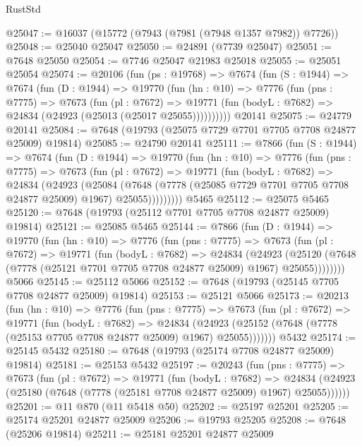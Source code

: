 \begin{lexlean}{RustStd}
\begin{coremodule}
{\begin{coremodule}
{{{{{{{{{{{{{{{{{{{{{{{{{{{{{{{{{{{{{{{{{{{{{{{{{{{{{@25047 := @16037 (@15772 (@7943 (@7981 (@7948 @1357 @7982)) @7726))
@25048 := @25040 @25047
@25050 := @24891 (@7739 @25047)
@25051 := @7648 @25050
@25054 := @7746 @25047 @21983 @25018
@25055 := @25051 @25054
@25074 := @20106
    (fun (ps : @19768) =>
    @7674
      (fun (S : @1944) =>
      @7674
        (fun (D : @1944) =>
        @19770
          (fun (hn : @10) =>
          @7776
            (fun (pns : @7775) =>
            @7673
              (fun (pl : @7672) =>
              @19771 (fun (bodyL : @7682) => @24834 (@24923 (@25013 (@25017 @25055))))))))))
    @20141
@25075 := @24779 @20141
@25084 := @7648 (@19793 (@25075 @7729 @7701 @7705 @7708 @24877 @25009) @19814)
@25085 := @24790 @20141
@25111 := @7866
    (fun (S : @1944) =>
    @7674
      (fun (D : @1944) =>
      @19770
        (fun (hn : @10) =>
        @7776
          (fun (pns : @7775) =>
          @7673
            (fun (pl : @7672) =>
            @19771
              (fun (bodyL : @7682) =>
              @24834
                (@24923
                  (@25084
                    (@7648
                      (@7778 (@25085 @7729 @7701 @7705 @7708 @24877 @25009) @1967)
                      @25055)))))))))
    @5465
@25112 := @25075 @5465
@25120 := @7648 (@19793 (@25112 @7701 @7705 @7708 @24877 @25009) @19814)
@25121 := @25085 @5465
@25144 := @7866
    (fun (D : @1944) =>
    @19770
      (fun (hn : @10) =>
      @7776
        (fun (pns : @7775) =>
        @7673
          (fun (pl : @7672) =>
          @19771
            (fun (bodyL : @7682) =>
            @24834
              (@24923
                (@25120 (@7648 (@7778 (@25121 @7701 @7705 @7708 @24877 @25009) @1967) @25055))))))))
    @5066
@25145 := @25112 @5066
@25152 := @7648 (@19793 (@25145 @7705 @7708 @24877 @25009) @19814)
@25153 := @25121 @5066
@25173 := @20213
    (fun (hn : @10) =>
    @7776
      (fun (pns : @7775) =>
      @7673
        (fun (pl : @7672) =>
        @19771
          (fun (bodyL : @7682) =>
          @24834
            (@24923 (@25152 (@7648 (@7778 (@25153 @7705 @7708 @24877 @25009) @1967) @25055)))))))
    @5432
@25174 := @25145 @5432
@25180 := @7648 (@19793 (@25174 @7708 @24877 @25009) @19814)
@25181 := @25153 @5432
@25197 := @20243
    (fun (pns : @7775) =>
    @7673
      (fun (pl : @7672) =>
      @19771
        (fun (bodyL : @7682) =>
        @24834 (@24923 (@25180 (@7648 (@7778 (@25181 @7708 @24877 @25009) @1967) @25055))))))
@25201 := @11 @870 (@11 @5418 @50)
@25202 := @25197 @25201
@25205 := @25174 @25201 @24877 @25009
@25206 := @19793 @25205
@25208 := @7648 (@25206 @19814)
@25211 := @25181 @25201 @24877 @25009
}}}}}}}}}}}}}}}}}}}}}}}}}}}}}}}}}}}}}}}}}}}}}}}}}}}}}
\end{coremodule}}
\end{coremodule}
\end{lexlean}
